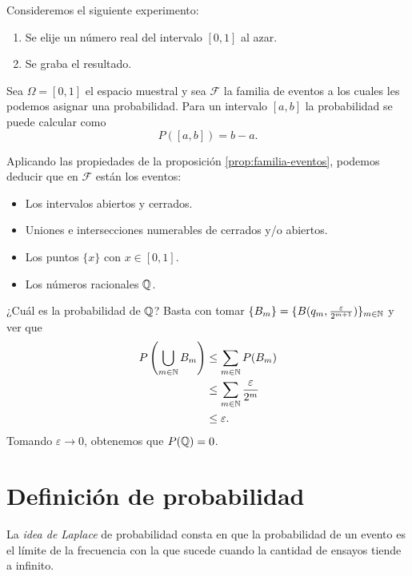 \begin{example}
    Consideremos el siguiente experimento:
    \begin{centeredvarwidth}
        \begin{enumerate}
            \item Se elije un número real del intervalo $[0, 1]$ al azar.
            \item Se graba el resultado.
        \end{enumerate}
    \end{centeredvarwidth}

    Sea $\Omega = [0, 1]$ el espacio muestral y sea $\mathcal{F}$ la familia de eventos a los cuales les podemos asignar una probabilidad. Para un intervalo $[a, b]$ la probabilidad se puede calcular como
    \begin{equation*}
        P([a, b]) = b - a.
    \end{equation*}

    Aplicando las propiedades de la proposición \ref{prop:familia-eventos}, podemos deducir que en $\mathcal{F}$ están los eventos:
    \begin{itemize}
        \item Los intervalos abiertos y cerrados.
        \item Uniones e intersecciones numerables de cerrados y/o abiertos.
        \item Los puntos $\{x\}$ con $x \in [0, 1]$.
        \item Los números racionales $\mathbb{Q}$.
    \end{itemize}

    ¿Cuál es la probabilidad de $\mathbb{Q}$? Basta con tomar $\{B_m\} = \{B(q_m, \frac{\varepsilon}{2^{m+1}})\}_{m \in \mathbb{N}}$ y ver que
    \begin{align*}
        P\left(\bigcup_{m \in \mathbb{N}} B_m\right) &\leq \sum_{m \in \mathbb{N}} P(B_m) \\
        &\leq \sum_{m \in \mathbb{N}} \frac{\varepsilon}{2^m} \\
        &\leq \varepsilon.
    \end{align*}
    Tomando $\varepsilon \to 0$, obtenemos que $P(\mathbb{Q}) = 0$.
\end{example}


\section{Definición de probabilidad}

La \textit{idea de Laplace} de probabilidad consta en que la probabilidad de un evento es el límite de la frecuencia con la que sucede cuando la cantidad de ensayos tiende a infinito.

